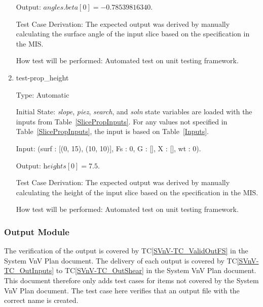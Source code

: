 \documentclass[12pt, titlepage]{article}
\newcommand{\tcref}[1]{TC\ref{#1}}
\newcounter{utestnum} %
\begin{document}
\begin{enumerate}[label=TC\arabic*:,ref={\arabic*}]
	Output: $\textit{angles.beta}[0] = -0.78539816340$.
	
	Test Case Derivation: The expected output was derived by manually 
	calculating the surface angle of the input slice based on the specification 
	in the MIS.
	
	How test will be performed: Automated test on unit testing framework.
	
	\item [TC\refstepcounter{utestnum}\theutestnum: 
	\label{TC_PropertyHeight}] 
	test-prop\_height
	
	Type: Automatic
	
	Initial State: \textit{slope}, \textit{piez}, \textit{search}, and 
	\textit{soln} state variables are loaded with the inputs from 
	Table~\ref{SlicePropInputs}. For any values not specified in 
	Table~\ref{SlicePropInputs}, the input is based on Table~\ref{Inputs}.
	
	Input: (surf : [(0, 15), (10, 10)], Fs : 0, G : [], X : [], wt : 
	0).
	
	Output: $\textit{heights}[0] = 7.5$.
	
	Test Case Derivation: The expected output was derived by manually 
	calculating the height of the input slice based on the specification in the 
	MIS.
	
	How test will be performed: Automated test on unit testing framework.
	
\end{enumerate}

\subsubsection{Output Module}
The verification of the output is covered by \tcref{SVnV-TC_ValidOutFS} in the 
System VnV Plan document. The delivery of each output is covered by 
\tcref{SVnV-TC_OutInputs} to \tcref{SVnV-TC_OutShear} in the System VnV Plan 
document. This document therefore only adds test cases for items not covered by 
the System VnV Plan document. The test case here verifies that an output file 
with the correct name is created.
\end{document}
